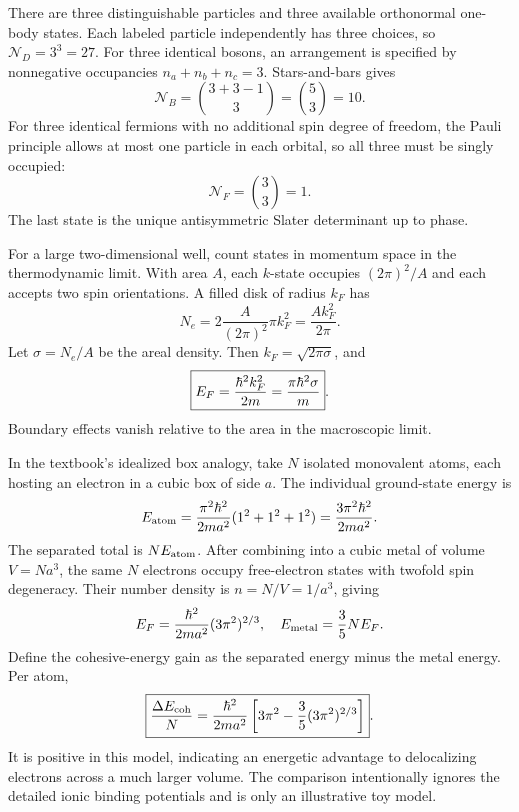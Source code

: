 There are three distinguishable particles and
three available orthonormal one-body states.
Each labeled particle independently has
three choices, so
$\boxed{\mathcal N_D=3^3=27}$.
For three identical bosons, an arrangement
is specified by nonnegative occupancies
$n_a+n_b+n_c=3$. Stars-and-bars gives
\begin{equation}
\boxed{\mathcal N_B=
\binom{3+3-1}{3}=\binom53=10}.
\end{equation}
For three identical fermions with no additional
spin degree of freedom, the Pauli principle
allows at most one particle in each orbital,
so all three must be singly occupied:
\begin{equation}
\boxed{\mathcal N_F=\binom33=1}.
\end{equation}
The last state is the unique antisymmetric
Slater determinant up to phase.

For a large two-dimensional well, count
states in momentum space in the
thermodynamic limit. With area $A$,
each $k$-state occupies $(2\pi)^2/A$
and each accepts two spin orientations.
A filled disk of radius $k_F$ has
\begin{equation}
N_e=2\frac{A}{(2\pi)^2}\pi k_F^2
=\frac{Ak_F^2}{2\pi}.
\end{equation}
Let $\sigma=N_e/A$ be the areal density.
Then
$\boxed{k_F=\sqrt{2\pi\sigma}}$,
and
\begin{equation}
\boxed{E_F=\frac{\hbar^2k_F^2}{2m}
=\frac{\pi\hbar^2\sigma}{m}}.
\end{equation}
Boundary effects vanish relative to
the area in the macroscopic limit.

In the textbook's idealized box analogy,
take $N$ isolated monovalent atoms, each
hosting an electron in a cubic box of
side $a$. The individual ground-state
energy is
\begin{equation}
E_{\rm atom}=
\frac{\pi^2\hbar^2}{2ma^2}(1^2+1^2+1^2)
=\frac{3\pi^2\hbar^2}{2ma^2}.
\end{equation}
The separated total is $NE_{\rm atom}$.
After combining into a cubic metal
of volume $V=Na^3$, the same $N$
electrons occupy free-electron states
with twofold spin degeneracy.
Their number density is
$n=N/V=1/a^3$, giving
\begin{equation}
E_F=\frac{\hbar^2}{2ma^2}(3\pi^2)^{2/3},
\quad
E_{\rm metal}=\frac35 NE_F.
\end{equation}
Define the cohesive-energy gain
as the separated energy minus the
metal energy. Per atom,
\begin{equation}
\boxed{\frac{\Delta E_{\rm coh}}N=
\frac{\hbar^2}{2ma^2}\left[
3\pi^2-\frac35(3\pi^2)^{2/3}\right]}.
\end{equation}
It is positive in this model, indicating
an energetic advantage to delocalizing
electrons across a much larger volume.
The comparison intentionally ignores
the detailed ionic binding potentials
and is only an illustrative toy model.

